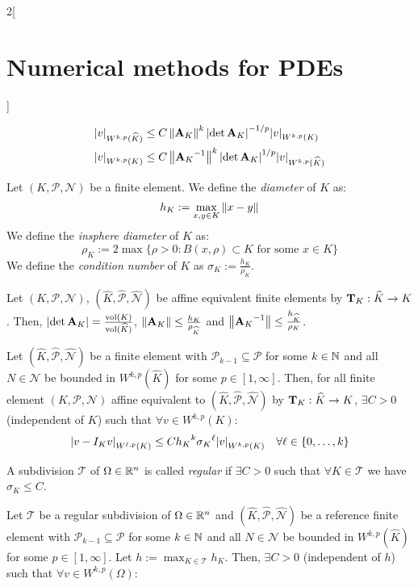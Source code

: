 \documentclass[../../../main_math.tex]{subfiles}
\begin{document}
\begin{multicols}{2}[\section{Numerical methods for PDEs}]
\begin{lemma}
    \begin{align*}
      \abs{v}_{W^{k,p}(\widehat{K})} & \leq C\left\|\boldsymbol{\mathrm{A}}_K\right\|^k\abs{\det \boldsymbol{\mathrm{A}}_K}^{-1/p}\abs{v}_{W^{k,p}(K)}                 \\
      \abs{v}_{W^{k,p}(K)}           & \leq C\left\|{\boldsymbol{\mathrm{A}}_K}^{-1}\right\|^k\abs{\det \boldsymbol{\mathrm{A}}_K}^{1/p}\abs{v}_{W^{k,p}(\widehat{K})}
    \end{align*}
  \end{lemma}
  \begin{definition}
    Let $(K,\mathcal{P},\mathcal{N})$ be a finite element. We define the \emph{diameter} of $K$ as:
    $$
      h_K:=\max_{x,y\in K}\left\|x-y\right\|
    $$
    We define the \emph{insphere diameter} of $K$ as:
    $$
      \rho_K:=2\max\{\rho>0:B(x,\rho)\subset K\text{ for some }x\in K\}
    $$
    We define the \emph{condition number} of $K$ as $\sigma_K:=\frac{h_K}{\rho_K}$.
  \end{definition}
  \begin{lemma}
    Let $(K,\mathcal{P},\mathcal{N})$, $(\widehat{K}, \widehat{\mathcal{P}}, \widehat{\mathcal{N}})$ be affine equivalent finite elements by $\boldsymbol{\mathrm{T}}_K:\widehat{K}\to K$. Then, $\abs{\det \boldsymbol{\mathrm{A}}_K}=\frac{\operatorname{vol}(K)}{\operatorname{vol}(\widehat{K})}$, $\left\|\boldsymbol{\mathrm{A}}_K\right\|\leq \frac{h_K}{\rho_{\widehat{K}}}$ and $\left\|{\boldsymbol{\mathrm{A}}_K}^{-1}\right\|\leq \frac{h_{\widehat{K}}}{\rho_K}$.
  \end{lemma}
  \begin{theorem}
    Let $(\widehat{K}, \widehat{\mathcal{P}}, \widehat{\mathcal{N}})$ be a finite element with $\mathcal{P}_{k-1}\subseteq \mathcal{P}$ for some $k\in\mathbb{N}$ and all $N\in\mathcal{N}$ be bounded in $W^{k,p}(\widehat{K})$ for some $p\in[1,\infty]$. Then, for all finite element $(K,\mathcal{P},\mathcal{N})$ affine equivalent to $(\widehat{K}, \widehat{\mathcal{P}}, \widehat{\mathcal{N}})$ by $\boldsymbol{\mathrm{T}}_K:\widehat{K}\to K$, $\exists C>0$ (independent of $K$) such that $\forall v\in W^{k,p}(K)$:
    $$
      \abs{v-I_Kv}_{W^{\ell,p}(K)}\leq C{h_K}^k{\sigma_K}^{\ell}\abs{v}_{W^{k,p}(K)} \quad\forall \ell\in\{0,\ldots,k\}
    $$
  \end{theorem}
  \begin{definition}
    A subdivision $\mathcal{T}$ of $\Omega\in \mathbb{R}^n$ is called \emph{regular} if $\exists C>0$ such that $\forall K\in\mathcal{T}$ we have $\sigma_K\leq C$.
  \end{definition}
  \begin{theorem}
    Let $\mathcal{T}$ be a regular subdivision of $\Omega\in \mathbb{R}^n$ and $(\widehat{K}, \widehat{\mathcal{P}}, \widehat{\mathcal{N}})$ be a reference finite element with $\mathcal{P}_{k-1}\subseteq \mathcal{P}$ for some $k\in\mathbb{N}$ and all $N\in\mathcal{N}$ be bounded in $W^{k,p}(\widehat{K})$ for some $p\in[1,\infty]$. Let $h:= \max_{K\in\mathcal{T}}h_K$. Then, $\exists C>0$ (independent of $h$) such that $\forall v\in W^{k,p}(\Omega)$:

\end{theorem}
\end{multicols}
\end{document}
